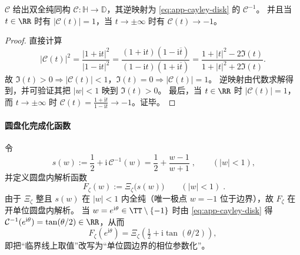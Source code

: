 \begin{proposition}\label{prop:app-cayley-upperhalf-disk}
\(\mathcal{C}\) 给出双全纯同构 \(\mathcal{C}:\mathbb{H}\to\mathbb{D}\)，其逆映射为 \eqref{eq:app-cayley-disk} 的 \(\mathcal{C}^{-1}\)。
并且当 \(t\in\RR\) 时有 \(|\mathcal{C}(t)|=1\)，当 \(t\to\pm\infty\) 时有 \(\mathcal{C}(t)\to-1\)。
\end{proposition}
\begin{proof}
直接计算
\[
|\mathcal{C}(t)|^2
=\frac{|1+\mathrm{i}t|^2}{|1-\mathrm{i}t|^2}
=\frac{(1+\mathrm{i}t)(1-\mathrm{i}\overline t)}{(1-\mathrm{i}t)(1+\mathrm{i}\overline t)}
=\frac{1+|t|^2-2\Im(t)}{1+|t|^2+2\Im(t)}.
\]
故 \(\Im(t)>0\Rightarrow |\mathcal{C}(t)|<1\)，\(\Im(t)=0\Rightarrow |\mathcal{C}(t)|=1\)。
逆映射由代数求解得到，并可验证其把 \(|w|<1\) 映到 \(\Im(t)>0\)。
最后，当 \(t\in\RR\) 时 \(|\mathcal{C}(t)|=1\)，而 \(t\to\pm\infty\) 时 \(\mathcal{C}(t)=\frac{1+\mathrm{i}t}{1-\mathrm{i}t}\to-1\)。证毕。
\end{proof}

\paragraph{圆盘化完成化函数}
令
\begin{equation}\label{eq:app-s-of-w}
\boxed{\;
s(w):=\frac12+\mathrm{i}\,\mathcal{C}^{-1}(w)
=\frac12+\frac{w-1}{w+1}\; },
\qquad (|w|<1),
\end{equation}
并定义圆盘内解析函数
\begin{equation}\label{eq:app-Fzeta-disk}
\boxed{\;
F_{\zeta}(w):=\Xi_{\zeta}\!\bigl(s(w)\bigr)\qquad(|w|<1)\; }.
\end{equation}
由于 \(\Xi_{\zeta}\) 整且 \(s(w)\) 在 \(|w|<1\) 内全纯（唯一极点 \(w=-1\) 位于边界），故 \(F_{\zeta}\) 在开单位圆盘内解析。
当 \(w=e^{\mathrm{i}\theta}\in\TT\setminus\{-1\}\) 时由 \eqref{eq:app-cayley-disk} 得 \(\mathcal{C}^{-1}(e^{\mathrm{i}\theta})=\tan(\theta/2)\in\RR\)，从而
\begin{equation}\label{eq:app-Fzeta-boundary}
F_{\zeta}(e^{\mathrm{i}\theta})=\Xi_{\zeta}\!\left(\tfrac12+\mathrm{i}\tan(\theta/2)\right),
\end{equation}
即把“临界线上取值”改写为“单位圆边界的相位参数化”。


